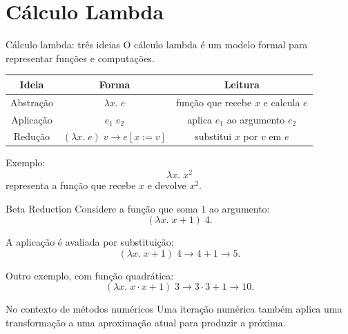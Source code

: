 \documentclass[aspectratio=169,11pt]{beamer}
\begin{document}
\section{Cálculo Lambda}

\begin{frame}{Cálculo lambda: três ideias}
  O cálculo lambda é um modelo formal para representar funções e computações.

  \begin{center}
    \begin{tabular}{c|c|c}
      \toprule
      Ideia & Forma & Leitura \\
      \midrule
      Abstração & $\lambda x.\;e$ & função que recebe $x$ e calcula $e$ \\
      Aplicação & $e_1\;e_2$ & aplica $e_1$ ao argumento $e_2$ \\
      Redução & $(\lambda x.\;e)\;v \to e[x:=v]$ & substitui $x$ por $v$ em $e$ \\
      \bottomrule
    \end{tabular}
  \end{center}

  \vspace{0.2cm}
  Exemplo:
  \begin{equation*}
    \lambda x.\;x^2
  \end{equation*}
  representa a função que recebe $x$ e devolve $x^2$.
\end{frame}

\begin{frame}{Beta Reduction}
  Considere a função que soma $1$ ao argumento:
  \begin{equation*}
    (\lambda x.\;x+1)\;4.
  \end{equation*}

  A aplicação é avaliada por substituição:
  \begin{equation*}
    (\lambda x.\;x+1)\;4
    \longrightarrow
    4+1
    \longrightarrow
    5.
  \end{equation*}

  Outro exemplo, com função quadrática:
  \begin{equation*}
    (\lambda x.\;x\cdot x + 1)\;3
    \longrightarrow
    3\cdot 3+1
    \longrightarrow
    10.
  \end{equation*}

  \begin{block}{No contexto de métodos numéricos}
    Uma iteração numérica também aplica uma transformação a uma aproximação atual para produzir a próxima.
  \end{block}
\end{frame}
\end{document}

